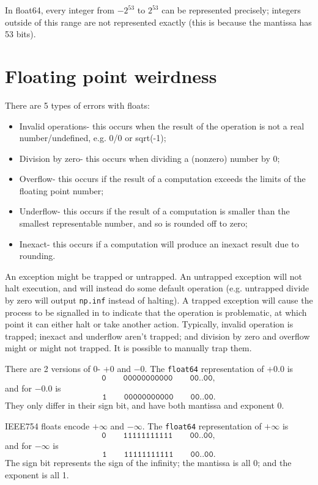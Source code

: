 \documentclass[a4paper, openany]{memoir}
\begin{document}
    In float64, every integer from $-2^{53}$ to $2^{53}$ can be represented precisely; integers outside of this range are not represented exactly (this is because the mantissa has 53 bits).

    \section{Floating point weirdness}
    There are 5 types of errors with floats:
    \begin{itemize}
        \item Invalid operations- this occurs when the result of the operation is not a real number/undefined, e.g. 0/0 or sqrt(-1);
        \item Division by zero- this occurs when dividing a (nonzero) number by 0;
        \item Overflow- this occurs if the result of a computation exceeds the limits of the floating point number;
        \item Underflow- this occurs if the result of a computation is smaller than the smallest representable number, and so is rounded off to zero;
        \item Inexact- this occurs if a computation will produce an inexact result due to rounding.
    \end{itemize}

    An exception might be trapped or untrapped. An untrapped exception will not halt execution, and will instead do some default operation (e.g. untrapped divide by zero will output \texttt{np.inf} instead of halting). A trapped exception will cause the process to be signalled in to indicate that the operation is problematic, at which point it can either halt or take another action. Typically, invalid operation is trapped; inexact and underflow aren't trapped; and division by zero and overflow might or might not trapped. It is possible to manually trap them.

    There are 2 versions of 0- $+0$ and $-0$. The \texttt{float64} representation of $+0.0$ is
    \[\texttt{0} \qquad \texttt{00000000000} \qquad \texttt{00..00},\]        
    and for $-0.0$ is
    \[\texttt{1} \qquad \texttt{00000000000} \qquad \texttt{00..00}.\]
    They only differ in their sign bit, and have both mantissa and exponent 0.
    
    IEEE754 floats encode $+ \infty$ and $-\infty$. The \texttt{float64} representation of $+\infty$ is
    \[\texttt{0} \qquad \texttt{11111111111} \qquad \texttt{00..00},\]        
    and for $-\infty$ is
    \[\texttt{1} \qquad \texttt{11111111111} \qquad \texttt{00..00}.\]        
    The sign bit represents the sign of the infinity; the mantissa is all 0; and the exponent is all 1.
\end{document}

